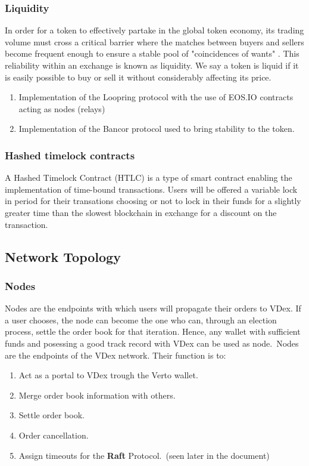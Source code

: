 \documentclass[]{article}
\begin{document}
	
	\subsubsection{Liquidity}
	In order for a token to effectively partake in the global token
	economy, its trading volume must cross a critical barrier where
	the matches between buyers and sellers become frequent enough to ensure a stable pool of "coincidences of wants" \cite{10}. 
	This reliability within an exchange is known as liquidity. We say a token is liquid if it is easily possible to buy or sell it without considerably affecting its price.
	
	\begin{enumerate} 
		\item Implementation of the Loopring protocol with the use of EOS.IO contracts acting as nodes (relays)\cite{7}
		\item Implementation of the Bancor protocol
		used to bring stability to the token.
	
	
		\end{enumerate}
	
	\subsubsection{Hashed timelock contracts}
	A Hashed Timelock Contract (HTLC)\cite{22} is a type of smart contract enabling the implementation of time-bound transactions.
	Users will be offered a variable lock in period for their transations choosing or not
	to lock in their funds for a slightly greater time than the slowest blockchain in exchange for a discount on the transaction.
	
	\subsection{Network Topology}
	\subsubsection{Nodes}
	Nodes are the endpoints with which users will propagate their orders to VDex. If a user chooses, the node can become the one who can, through an election process, settle the order book
	for that iteration.   
	Hence, any wallet with sufficient funds and posessing a good track record with VDex can be used as node.\
	Nodes are the endpoints of the VDex network.
	Their function is to:\
	\begin{enumerate}
		\item Act as a portal to VDex trough the Verto wallet.
		\item Merge order book information with others.
		\item Settle order book.\
		\item Order cancellation.\
		\item Assign timeouts for the \textbf{Raft} Protocol.\ (seen later in the document)
	\end{enumerate}
	
\end{document}
